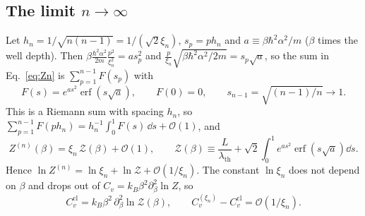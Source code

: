 \documentclass[11pt]{article}
\numberwithin{equation}{section}
\providecommand{\erf}{\operatorname{erf}}
\newcommand{\lth}{\lambda_{\mathrm{th}}}
\newcommand{\Ccl}{C_v^{\mathrm{cl}}}
\newcommand{\kB}{k_{B}}
\begin{document}
\subsection{The limit \texorpdfstring{$n\to\infty$}{n to infinity}}
Let $h_n=1/\sqrt{n(n-1)}=1/(\sqrt2\xi_n)$, $s_p=ph_n$ and $a\equiv\beta\hbar^2\alpha^2/m$ ($\beta$ times the well depth). Then $\beta\frac{\hbar^2\alpha^2}{2m}\frac{p^2}{\xi_n^2}=as_p^2$ and $\frac{p}{\xi_n}\sqrt{\beta\hbar^2\alpha^2/2m}=s_p\sqrt a$, so the sum in Eq.~\eqref{eq:Zn} is $\sum_{p=1}^{n-1}F(s_p)$ with
\begin{equation}
F(s)=e^{as^2}\erf\!\left(s\sqrt a\right),\qquad F(0)=0,\qquad s_{n-1}=\sqrt{(n-1)/n}\to1 .
\end{equation}
This is a Riemann sum with spacing $h_n$, so $\sum_{p=1}^{n-1}F(ph_n)=h_n^{-1}\int_0^1F(s)\,\dd s+\mathcal O(1)$, and
\begin{equation}
Z^{(n)}(\beta)=\xi_n\,\mathcal Z(\beta)+\mathcal O(1),\qquad
\mathcal Z(\beta)\equiv\frac{L}{\lth}+\sqrt2\int_0^1e^{as^2}\erf\!\left(s\sqrt a\right)\dd s .
\label{eq:Zlimit}
\end{equation}
Hence $\ln Z^{(n)}=\ln\xi_n+\ln\mathcal Z+\mathcal O(1/\xi_n)$. The constant $\ln\xi_n$ does not depend on $\beta$ and drops out of $C_v=\kB\beta^2\partial_\beta^2\ln Z$, so
\begin{equation}
\Ccl=\kB\beta^2\,\partial_\beta^2\ln\mathcal Z(\beta),\qquad C_v^{(\xi_n)}-\Ccl=\mathcal O(1/\xi_n).
\label{eq:Cclfromlimit}
\end{equation}
\end{document}
